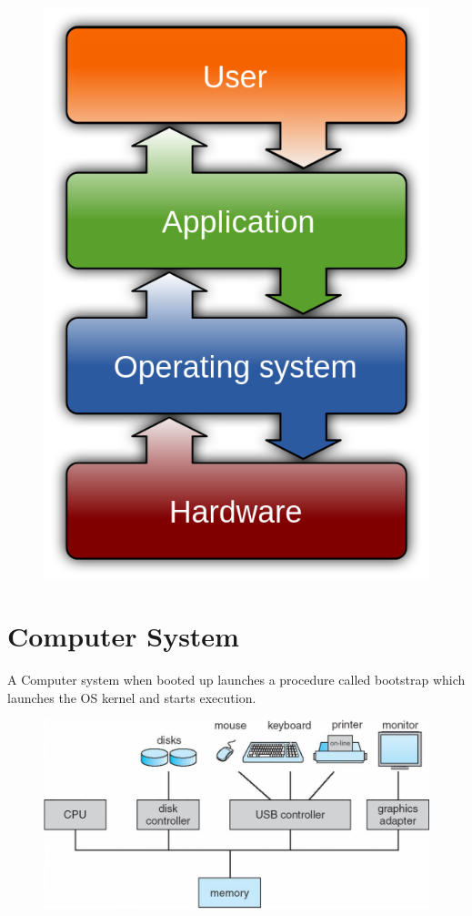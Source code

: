 \begin{figure}[htbp]
    \centering
    \includegraphics[scale=0.2]{img/Operating_system.png}
\end{figure}

\newpage
\section{Computer System}
A Computer system when booted up launches a procedure called bootstrap which launches the
OS kernel and starts execution.

\begin{figure}[htbp]
    \centering
    \includegraphics[scale=0.30]{img/cs.png}
\end{figure}

